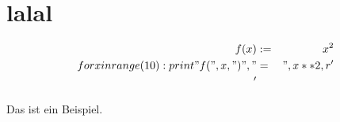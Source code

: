 \documentclass{article}
\begin{document}

\section{lalal}

\begin{eqnarray}
f(x) & := & x^2 \\
for x in range(10):
    print "f(", x, ")", " &=& ", x**2, r'\nonumber\\'
\end{eqnarray}


Das ist ein Beispiel.
\end{document}
